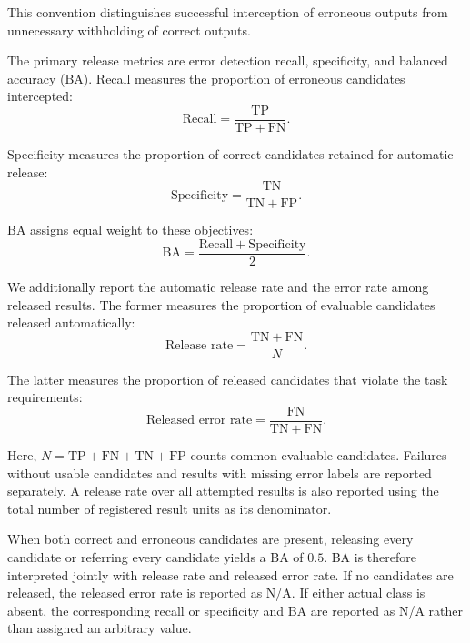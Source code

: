 \documentclass[preprint,12pt,authoryear]{elsarticle}
\begin{document}
This convention distinguishes successful interception of erroneous outputs from unnecessary withholding of correct outputs.

The primary release metrics are error detection recall, specificity, and balanced accuracy (BA). Recall measures the proportion of erroneous candidates intercepted:
\begin{equation}
    \mathrm{Recall}
    =
    \frac{\mathrm{TP}}
         {\mathrm{TP}+\mathrm{FN}}.
    \label{eq:exp_recall}
\end{equation}

Specificity measures the proportion of correct candidates retained for automatic release:
\begin{equation}
    \mathrm{Specificity}
    =
    \frac{\mathrm{TN}}
         {\mathrm{TN}+\mathrm{FP}}.
    \label{eq:exp_specificity}
\end{equation}

BA assigns equal weight to these objectives:
\begin{equation}
    \mathrm{BA}
    =
    \frac{\mathrm{Recall}+\mathrm{Specificity}}{2}.
    \label{eq:exp_balanced_accuracy}
\end{equation}

We additionally report the automatic release rate and the error rate among released results. The former measures the proportion of evaluable candidates released automatically:
\begin{equation}
    \text{Release rate}
    =
    \frac{\mathrm{TN}+\mathrm{FN}}{N}.
    \label{eq:exp_release_rate}
\end{equation}

The latter measures the proportion of released candidates
that violate the task requirements:
\begin{equation}
    \text{Released error rate}
    =
    \frac{\mathrm{FN}}
         {\mathrm{TN}+\mathrm{FN}}.
    \label{eq:exp_released_error_rate}
\end{equation}

Here, \(N=\mathrm{TP}+\mathrm{FN}+\mathrm{TN}+\mathrm{FP}\) counts common evaluable candidates. Failures without usable candidates and results with missing error labels are reported separately. A release rate over all attempted results is also reported using the total number of registered result units as its denominator.

When both correct and erroneous candidates are present, releasing every candidate or referring every candidate yields a BA of \(0.5\). BA is therefore interpreted jointly with release rate and released error rate. If no candidates are released, the released error rate is reported as N/A. If either actual class is absent, the corresponding recall or specificity and BA are reported as N/A rather than assigned an arbitrary value.
\end{document}
